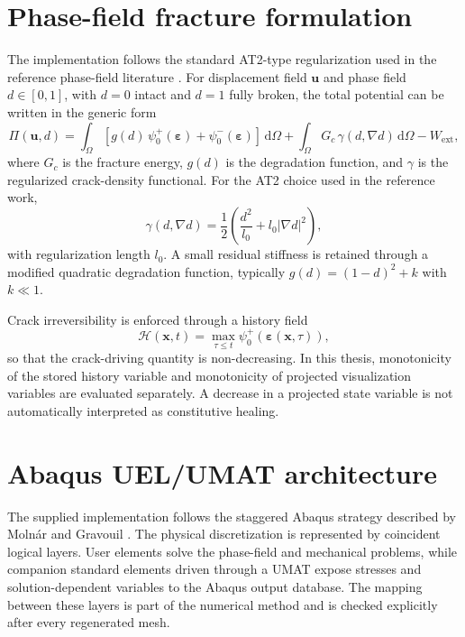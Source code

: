 \section{Phase-field fracture formulation}
The implementation follows the standard AT2-type regularization used in the reference phase-field literature \citep{Msekh2015,Molnar2017,Pandey2025}. For displacement field $\mathbf{u}$ and phase field $d\in[0,1]$, with $d=0$ intact and $d=1$ fully broken, the total potential can be written in the generic form
\begin{equation}
\Pi(\mathbf{u},d)=\int_\Omega \left[g(d)\,\psi_0^+(\boldsymbol\varepsilon)+\psi_0^-(\boldsymbol\varepsilon)\right]\,\mathrm{d}\Omega
+\int_\Omega G_c\,\gamma(d,\nabla d)\,\mathrm{d}\Omega-W_{\mathrm{ext}},
\end{equation}
where $G_c$ is the fracture energy, $g(d)$ is the degradation function, and $\gamma$ is the regularized crack-density functional. For the AT2 choice used in the reference work,
\begin{equation}
\gamma(d,\nabla d)=\frac{1}{2}\left(\frac{d^2}{l_0}+l_0\lvert\nabla d\rvert^2\right),
\end{equation}
with regularization length $l_0$. A small residual stiffness is retained through a modified quadratic degradation function, typically $g(d)=(1-d)^2+k$ with $k\ll1$.

Crack irreversibility is enforced through a history field
\begin{equation}
\mathcal{H}(\mathbf{x},t)=\max_{\tau\le t}\psi_0^+(\boldsymbol\varepsilon(\mathbf{x},\tau)),
\end{equation}
so that the crack-driving quantity is non-decreasing. In this thesis, monotonicity of the stored history variable and monotonicity of projected visualization variables are evaluated separately. A decrease in a projected state variable is not automatically interpreted as constitutive healing.

\section{Abaqus UEL/UMAT architecture}
The supplied implementation follows the staggered Abaqus strategy described by Moln\'ar and Gravouil \citep{Molnar2017}. The physical discretization is represented by coincident logical layers. User elements solve the phase-field and mechanical problems, while companion standard elements driven through a UMAT expose stresses and solution-dependent variables to the Abaqus output database. The mapping between these layers is part of the numerical method and is checked explicitly after every regenerated mesh.

